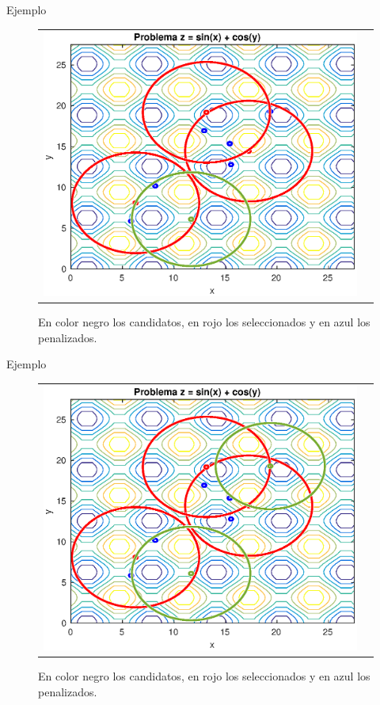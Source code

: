 \documentclass{beamer}
\begin{document}
\begin{frame}{Ejemplo}
\begin{figure}[H]
  \centering
  \begin{tabular}{c c}
   \includegraphics[scale=0.6]{5.eps} 
  \end{tabular}
  \caption{\scriptsize En color negro los candidatos, en rojo los seleccionados y en azul los penalizados.}
\end{figure}
\end{frame}

\begin{frame}{Ejemplo}
\begin{figure}[H]
  \centering
  \begin{tabular}{c c}
   \includegraphics[scale=0.6]{6.eps} 
  \end{tabular}
  \caption{\scriptsize En color negro los candidatos, en rojo los seleccionados y en azul los penalizados.}
\end{figure}
\end{frame}
\end{document}
